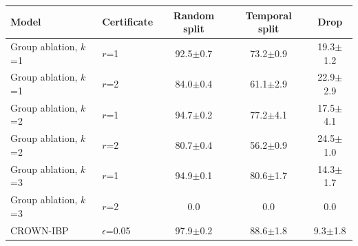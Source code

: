 \begin{tabular}{llccc}
\toprule
Model & Certificate & Random split & Temporal split & Drop \\
\midrule
Group ablation, $k$=1 & $r$=1 & 92.5$\pm$0.7 & 73.2$\pm$0.9 & 19.3$\pm$1.2 \\
Group ablation, $k$=1 & $r$=2 & 84.0$\pm$0.4 & 61.1$\pm$2.9 & 22.9$\pm$2.9 \\
Group ablation, $k$=2 & $r$=1 & 94.7$\pm$0.2 & 77.2$\pm$4.1 & 17.5$\pm$4.1 \\
Group ablation, $k$=2 & $r$=2 & 80.7$\pm$0.4 & 56.2$\pm$0.9 & 24.5$\pm$1.0 \\
Group ablation, $k$=3 & $r$=1 & 94.9$\pm$0.1 & 80.6$\pm$1.7 & 14.3$\pm$1.7 \\
Group ablation, $k$=3 & $r$=2 & 0.0 & 0.0 & 0.0 \\
CROWN-IBP & $\epsilon$=0.05 & 97.9$\pm$0.2 & 88.6$\pm$1.8 & 9.3$\pm$1.8 \\
\bottomrule
\end{tabular}